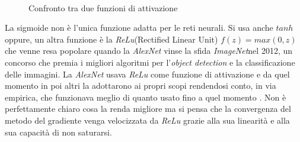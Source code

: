 
\begin{figure}[hbtb]
\centering
{} \qquad
{} \\
\caption{Confronto tra due funzioni di attivazione}
\label{fig:subfig}
\end{figure}

La sigmoide non è l'unica funzione adatta per le reti neurali. Si usa anche $tanh$ oppure, un altra funzione è la \textit{ReLu}(Rectified Linear Unit)  $\displaystyle f(z)=max(0,z)$ che venne resa popolare quando la \textit{AlexNet} vinse la sfida \textit{ImageNet}nel 2012, un concorso che premia i migliori algoritmi per l'\textit{object detection} e la classificazione delle immagini. La \textit{AlexNet} usava \textit{ReLu} come funzione di attivazione e da quel momento in poi altri la adottarono ai propri scopi rendendosi conto, in via empirica, che funzionava meglio di quanto usato fino a quel momento \cite{quora:relu}. Non è perfettamente chiaro cosa la renda migliore ma si pensa che la convergenza del metodo del gradiente venga velocizzata da \textit{ReLu} grazie alla sua linearità e alla sua capacità di non saturarsi\cite{cs23}.

